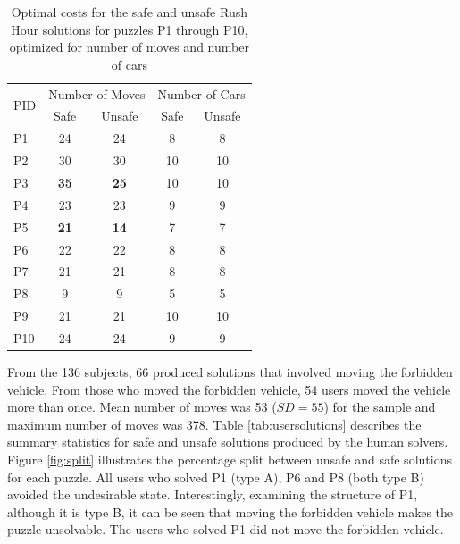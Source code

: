 \documentclass[doctor]{thesis} %
\theoremstyle{plain}
\begin{document}
\begin{table}[!htb]
\begin{tabular}{|l|c|c|c|c|}
\hline
\multirow{2}{*}{PID} & \multicolumn{2}{l|}{Number of Moves} & \multicolumn{2}{l|}{Number of Cars} \\ \cline{2-5} 
    & Safe & Unsafe & Safe & Unsafe \\ \hline
P1  & 24   & 24     & 8    & 8      \\ 
P2  & 30   & 30     & 10   & 10     \\ 
P3  & \textbf{35}   & \textbf{25}     & 10   & 10     \\ 
P4  & 23   & 23     & 9    & 9      \\ 
P5  & \textbf{21}   & \textbf{14}     & 7    & 7      \\ 
P6  & 22   & 22     & 8    & 8      \\ 
P7  & 21   & 21     & 8    & 8      \\ 
P8  & 9    & 9      & 5    & 5      \\ 
P9  & 21   & 21     & 10   & 10     \\
P10 & 24   & 24     & 9    & 9      \\ \hline
\end{tabular}
\caption{Optimal costs for the safe and unsafe Rush Hour solutions for puzzles P1 through P10, optimized for number of moves and number of cars}
\label{tab:optimals}
\end{table}

From the 136 subjects, 66 produced solutions that involved moving the forbidden vehicle. From those who moved the forbidden vehicle, 54 users moved the vehicle more than once. Mean number of moves was 53 ($SD=55$) for the sample and maximum number of moves was 378. Table \ref{tab:usersolutions} describes the summary statistics for safe and unsafe solutions produced by the human solvers. Figure \ref{fig:split} illustrates the percentage split between unsafe and safe solutions for each puzzle. All users who solved P1 (type A), P6 and P8 (both type B) avoided the undesirable state. Interestingly, examining the structure of P1, although it is type B, it can be seen that moving the forbidden vehicle makes the puzzle unsolvable. The users who solved P1 did not move the forbidden vehicle. 
\end{document}
